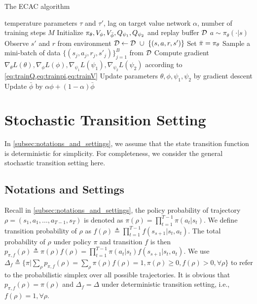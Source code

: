 \begin{algorithm}[t]
	\caption{\label{alg:rmac}  The ECAC algorithm}
	\begin{algorithmic}[1]
		\INPUT temperature parameters $\tau$ and $\tau'$, lag on target value network $\alpha$, number of training steps $M$
		\STATE Initialize $\pi_{\theta}, V_{\phi}, V_{\bar{\phi}}, Q_{\psi_1}, Q_{\psi_2}$ and replay buffer ${\mathcal{D}}$
			\STATE $a\sim \pi_\theta(\cdot | s)$
			\STATE Observe $s'$ and $r$ from environment
			\STATE $\gD \leftarrow \gD\ \cup\ \left\{ \left(s, a, r, s'\right) \right\}$
			\ENDFOR
			\STATE Set $\bar{\pi} = \pi_{\theta}$
			\STATE Sample a mini-batch of data $\{ (s_j, a_j, r_j, s'_j) \}_{j=1}^B$ from ${\mathcal{D}}$
			\STATE Compute gradient $\nabla_\theta L(\theta), \nabla_\phi L(\phi), \nabla_{\psi_1} L(\psi_1),  \nabla_{\psi_2} L(\psi_2)$ according to \cref{eq:trainQ,eq:trainpi,eq:trainV}
			\STATE Update parameters $\theta, \phi, \psi_1, \psi_2$ by gradient descent
			\STATE Update $\bar{\phi}$ by $\alpha \phi + (1-\alpha) \bar{\phi}$
			\ENDFOR
		\ENDFOR
	\end{algorithmic}
\end{algorithm}

\section{Stochastic Transition Setting}
\label{sec:stochasticsetting}
In \cref{subsec:notations_and_settings}, we assume that the state transition function is deterministic for simplicity. For completeness, we consider the general stochastic transition setting here.

\subsection{Notations and Settings}

Recall in \cref{subsec:notations_and_settings}, the policy probability of trajectory $\rho=(s_1, a_1, \dots, a_{T-1}, s_T)$ is denoted as $\pi(\rho) = \prod_{t=1}^{T-1} \pi(a_t| s_t)$. We define transition probability of $\rho$ as $f(\rho) \triangleq \prod_{t=1}^{T-1}{ f(s_{s+1} | s_t, a_t)}$. The total probability of $\rho$ under policy $\pi$ and transition $f$ is then $p_{\pi, f}(\rho) \triangleq \pi(\rho) f(\rho) = \prod_{t=1}^{T-1}{ \pi(a_t | s_t) f(s_{s+1} | s_t, a_t)}$. We use $\Delta_{f} \triangleq \{ \pi | \sum_{\rho}{ p_{\pi, f}(\rho) } = \sum_{\rho}{\pi(\rho) f(\rho)} = 1, \pi(\rho) \ge 0, f(\rho) > 0, \forall \rho \}$ to refer to the probabilistic simplex over all possible trajectories. It is obvious that $p_{\pi, f}(\rho) = \pi(\rho)$ and $\Delta_f = \Delta$ under deterministic transition setting, i.e., $f(\rho) = 1, \forall \rho$.

